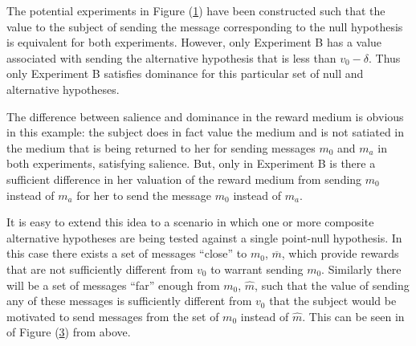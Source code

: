 \documentclass[../main.tex]{subfiles}
\begin{document}
\begin{figure}[h!]
	\centering
	\caption{ Flat Maximum Critique - \textcite{Harrison1992} }
	\label{fig:H1992:Dom}
	\begin{subfigure}{.5\textwidth}
		\centering
		\caption{}
		\label{fig:H1992:Dom-a}
	\end{subfigure}%
	\begin{subfigure}{.5\textwidth}
		\centering
		\caption{}
		\label{fig:H1992:Dom-b}
	\end{subfigure}
\end{figure}


The potential experiments in Figure (\ref{fig:H1992:Dom-a}) have been constructed such that the value to the subject of sending the message corresponding to the null hypothesis is equivalent for both experiments.
However, only Experiment B has a value associated with sending the alternative hypothesis that is less than $v_0 - \delta$.
Thus only Experiment B satisfies dominance for this particular set of null and alternative hypotheses.

The difference between salience and dominance in the reward medium is obvious in this example: the subject does in fact value the medium and is not satiated in the medium that is being returned to her for sending messages $m_0$ and $m_a$ in both experiments, satisfying salience.
But, only in Experiment B is there a sufficient difference in her valuation of the reward medium from sending $m_0$ instead of $m_a$ for her to send the message $m_0$ instead of $m_a$.

It is easy to extend this idea to a scenario in which one or more composite alternative hypotheses are being tested against a single point-null hypothesis.
In this case there exists a set of messages \enquote{close} to $m_0$, $\overbar{m}$, which provide rewards that are not sufficiently different from $v_0$ to warrant sending $m_0$.
Similarly there will be a set of messages \enquote{far} enough from $m_0$, $\hat{m}$, such that the value of sending any of these messages is sufficiently different from $v_0$ that the subject would be motivated to send messages from the set of $m_0$ instead of $\hat{m}$.
This can be seen in of Figure (\ref{fig:H1992:Dom-b}) from \textcite{Harrison1992} above.
\end{document}
